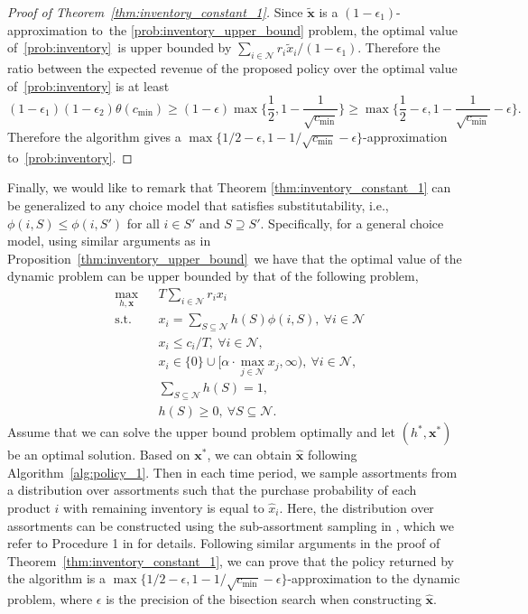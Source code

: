 \documentclass[mnsc,non-blindrev]{informs3}
\theoremstyle{definition}
\begin{document}
\begin{proof}[Proof of Theorem~\ref{thm:inventory_constant_1}]
Since $\tilde{\bm{x}}$ is a $(1-\epsilon_1)$-approximation to~the \ref{prob:inventory_upper_bound} problem, the optimal value of~\ref{prob:inventory}~is upper bounded by $\sum_{i\in\mathcal{N}}r_i\tilde{x}_i/(1-\epsilon_1)$. Therefore the ratio between the expected revenue of the proposed policy over the optimal value of~\ref{prob:inventory} is at least
\begin{equation*}
(1-\epsilon_1)(1-\epsilon_2)\theta(c_{\min})\geq (1-\epsilon)\max\Big\{\dfrac{1}{2},1-\dfrac{1}{\sqrt{c_{\min}}}\Big\}\geq\max\Big\{\dfrac{1}{2}-\epsilon,1-\dfrac{1}{\sqrt{c_{\min}}}-\epsilon\Big\}.
\end{equation*}
Therefore the algorithm gives a $\max\{{1}/{2}-\epsilon,1-{1}/{\sqrt{c_{\min}}}-\epsilon\}$-approximation to~\ref{prob:inventory}.
\end{proof}

{  Finally, we would like to remark that Theorem \ref{thm:inventory_constant_1} can be generalized to any choice model that satisfies substitutability, i.e., $\phi(i,S)\leq \phi(i,S')$ for all $i\in S'$ and $S\supseteq S'$. Specifically, for a general choice model, using similar arguments as in Proposition~\ref{thm:inventory_upper_bound}~we have that the optimal value of the dynamic problem can be upper bounded by that of the following problem,
\begin{equation*}
\begin{aligned}
&\max_{h,\bm{x}}&&T\sum_{i\in\mathcal{N}}r_ix_i\\
&\text{s.t.}&&x_i=\sum_{S\subseteq\mathcal{N}}h(S)\phi(i,S),\ \forall i\in\mathcal{N}\\
&&&x_i\leq c_i/T,\ \forall i\in\mathcal{N},\\
&&&x_i\in\{0\}\cup\Big[\alpha\cdot \max_{j\in\mathcal{N}}x_j,\infty\Big),\ \forall i\in\mathcal{N},\\
&&&\sum_{S\subseteq\mathcal{N}}h(S)=1,\\
&&&h(S)\geq 0,\ \forall S\subseteq\mathcal{N}.
\end{aligned}
\end{equation*}
Assume that we can solve the upper bound problem optimally and let $(h^*,\bm{x}^*)$ be an optimal solution. Based on $\bm{x}^*$, we can obtain $\hat{\bm{x}}$ following Algorithm~\ref{alg:policy_1}. Then in each time period, we sample assortments from a distribution over assortments such that the purchase probability of each product $i$ with remaining inventory is equal to $\hat{x}_i$. Here, the distribution over assortments can be constructed using the sub-assortment sampling in \cite{feng2024near}, which we refer to Procedure 1 in \cite{feng2024near} for details. Following similar arguments in the proof of Theorem~\ref{thm:inventory_constant_1}, we can prove that the policy returned by the algorithm is a $\max\{1/2-\epsilon,1-1/\sqrt{c_{\min}}-\epsilon\}$-approximation to the dynamic problem, where $\epsilon$ is the precision of the bisection search when constructing $\hat{\bm{x}}$.
} 
\end{document}
